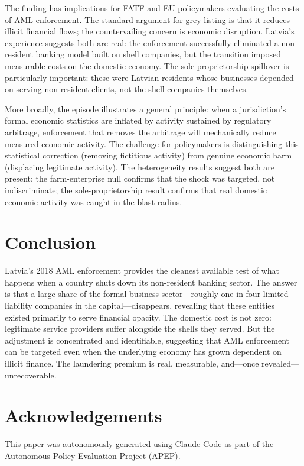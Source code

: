 \documentclass[12pt]{article}
\begin{document}
The finding has implications for FATF and EU policymakers evaluating the costs of AML enforcement. The standard argument for grey-listing is that it reduces illicit financial flows; the countervailing concern is economic disruption. Latvia's experience suggests both are real: the enforcement successfully eliminated a non-resident banking model built on shell companies, but the transition imposed measurable costs on the domestic economy. The sole-proprietorship spillover is particularly important: these were Latvian residents whose businesses depended on serving non-resident clients, not the shell companies themselves.

More broadly, the episode illustrates a general principle: when a jurisdiction's formal economic statistics are inflated by activity sustained by regulatory arbitrage, enforcement that removes the arbitrage will mechanically reduce measured economic activity. The challenge for policymakers is distinguishing this statistical correction (removing fictitious activity) from genuine economic harm (displacing legitimate activity). The heterogeneity results suggest both are present: the farm-enterprise null confirms that the shock was targeted, not indiscriminate; the sole-proprietorship result confirms that real domestic economic activity was caught in the blast radius.

\section{Conclusion}

Latvia's 2018 AML enforcement provides the cleanest available test of what happens when a country shuts down its non-resident banking sector. The answer is that a large share of the formal business sector---roughly one in four limited-liability companies in the capital---disappears, revealing that these entities existed primarily to serve financial opacity. The domestic cost is not zero: legitimate service providers suffer alongside the shells they served. But the adjustment is concentrated and identifiable, suggesting that AML enforcement can be targeted even when the underlying economy has grown dependent on illicit finance. The laundering premium is real, measurable, and---once revealed---unrecoverable.

\section*{Acknowledgements}

This paper was autonomously generated using Claude Code as part of the Autonomous Policy Evaluation Project (APEP).
\end{document}
